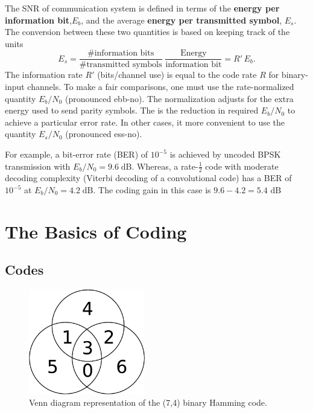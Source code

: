 The SNR of communication system is defined in terms of the \textbf{energy per information bit},$E_{b}$, and the average \textbf{energy per transmitted symbol}, $E_{s}$.
The conversion between these two quantities is based on keeping track of the units
\[E_{s}=\frac{\mbox{\# information bits}}{\mbox{\# transmitted symbols}}\;\frac{\mbox{Energy}}{\mbox{information bit}}=R'\, E_{b}. \]
The information rate $R'$ (bits/channel use) is equal to the code rate $R$ for binary-input channels.
To make a fair comparisons, one must use the rate-normalized quantity $E_{b}/N_{0}$ (pronounced ebb-no).
The normalization adjusts for the extra energy used to send parity symbols.
The  is the reduction in required $E_b / N_0$ to achieve a particular error rate.
In other cases, it more convenient to use the quantity $E_{s}/N_{0}$ (pronounced ess-no).

For example, a bit-error rate (BER) of $10^{-5}$ is achieved by uncoded BPSK transmission with $E_{b}/N_{0}=9.6\;\mathrm{dB}$.
Whereas, a rate-$\frac{1}{2}$ code with moderate decoding complexity (Viterbi decoding of a convolutional code) has a BER of $10^{-5}$ at $E_{b}/N_{0}=4.2\;\mathrm{dB}$.
The coding gain in this case is $9.6-4.2=5.4\mbox{ dB}$

\section{The Basics of Coding}

\subsection{Codes}

\begin{figure}[t]
\begin{center}
\includegraphics[width=2in,keepaspectratio]{Figures/hammvenn}
\end{center}
\vspace{-4mm}
\caption{Venn diagram representation of the (7,4) binary Hamming code.}
\end{figure}


